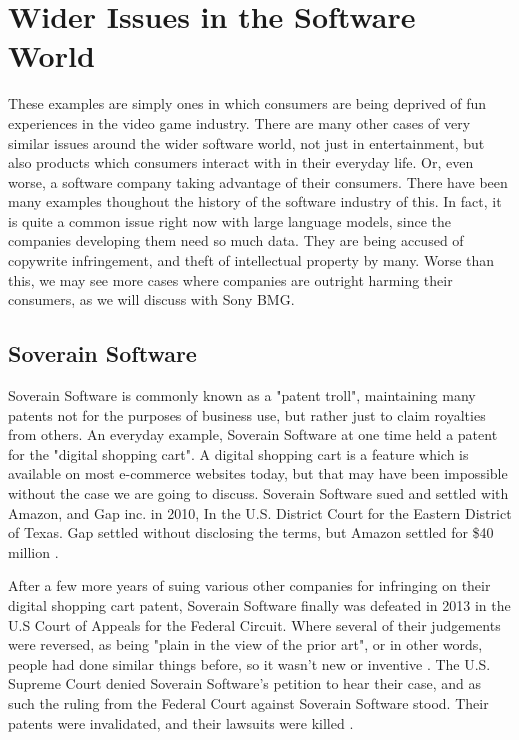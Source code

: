 \documentclass[12pt,letterpaper]{article}
\begin{document}
\section{Wider Issues in the Software World}
These examples are simply ones in which consumers are being deprived of fun experiences in the video game industry. There are many other cases of very similar issues around the wider software world, not just in entertainment, but also products which consumers interact with in their everyday life. Or, even worse, a software company taking advantage of their consumers. There have been many examples thoughout the history of the software industry of this. In fact, it is quite a common issue right now with large language models, since the companies developing them need so much data. They are being accused of copywrite infringement, and theft of intellectual property by many. Worse than this, we may see more cases where companies are outright harming their consumers, as we will discuss with Sony BMG.

\subsection{Soverain Software}
Soverain Software is commonly known as a "patent troll", maintaining many patents not for the purposes of business use, but rather just to claim royalties from others. An everyday example, Soverain Software at one time held a patent for the "digital shopping cart". A digital shopping cart is a feature which is available on most e-commerce websites today, but that may have been impossible without the case we are going to discuss. Soverain Software sued and settled with Amazon, and Gap inc. in 2010, In the U.S. District Court for the Eastern District of Texas. Gap settled without disclosing the terms, but Amazon settled for \$40 million \cite{Soverain}.

After a few more years of suing various other companies for infringing on their digital shopping cart patent, Soverain Software finally was defeated in 2013 in the U.S Court of Appeals for the Federal Circuit. Where several of their judgements were reversed, as being "plain in the view of the prior art", or in other words, people had done similar things before, so it wasn't new or inventive \cite{Soverain}. The U.S. Supreme Court denied Soverain Software's petition to hear their case, and as such the ruling from the Federal Court against Soverain Software stood. Their patents were invalidated, and their lawsuits were killed \cite{Soverain}.
\end{document}
